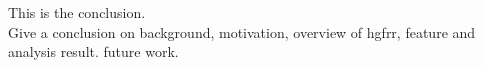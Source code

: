 This is the conclusion. \\

Give a conclusion on background, motivation, overview of hgfrr, feature and analysis result. future work.